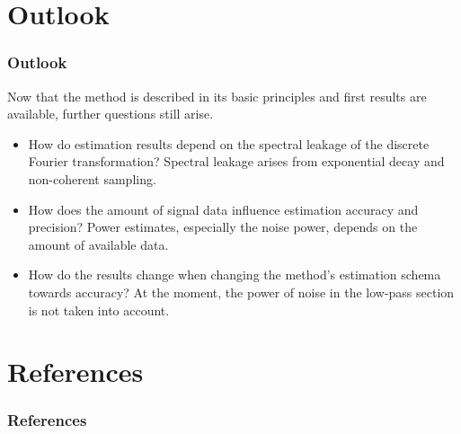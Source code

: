 \documentclass[11pt,aspectratio=169]{beamer}
\begin{document}
	\section{Outlook}
	\begin{frame}
		\frametitle{Outlook}
		Now that the method is described in its basic principles and first results are available, further questions still arise.
		\begin{itemize}
			\item How do estimation results depend on the spectral leakage of the discrete Fourier transformation? Spectral leakage arises from exponential decay and non-coherent sampling.
			\item How does the amount of signal data influence estimation accuracy and precision? Power estimates, especially the noise power, depends on the amount of available data.
			\item How do the results change when changing the method's estimation schema towards accuracy? At the moment, the power of noise in the low-pass section is not taken into account.
		\end{itemize}
	\end{frame}
	\section*{References}
	\begin{frame}[noframenumbering]
		\frametitle{References}
		\printbibliography
	\end{frame}
	\appendix
\end{document}
